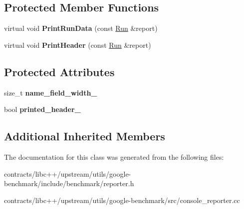 \subsection*{Protected Member Functions}
\begin{DoxyCompactItemize}
\item 
\mbox{\label{classbenchmark_1_1_console_reporter_a3759516cbd523319ffbd121514cfc7c0}} 
virtual void {\bfseries Print\+Run\+Data} (const \mbox{\hyperlink{structbenchmark_1_1_benchmark_reporter_1_1_run}{Run}} \&report)
\item 
\mbox{\label{classbenchmark_1_1_console_reporter_a9a039ddb97f3321309db8120c176f4d0}} 
virtual void {\bfseries Print\+Header} (const \mbox{\hyperlink{structbenchmark_1_1_benchmark_reporter_1_1_run}{Run}} \&report)
\end{DoxyCompactItemize}
\subsection*{Protected Attributes}
\begin{DoxyCompactItemize}
\item 
\mbox{\label{classbenchmark_1_1_console_reporter_a70035000337728074b93dfb9a95a7110}} 
size\+\_\+t {\bfseries name\+\_\+field\+\_\+width\+\_\+}
\item 
\mbox{\label{classbenchmark_1_1_console_reporter_a84683025b8ef739f751203e058c2544e}} 
bool {\bfseries printed\+\_\+header\+\_\+}
\end{DoxyCompactItemize}
\subsection*{Additional Inherited Members}


The documentation for this class was generated from the following files\+:\begin{DoxyCompactItemize}
\item 
contracts/libc++/upstream/utils/google-\/benchmark/include/benchmark/reporter.\+h\item 
contracts/libc++/upstream/utils/google-\/benchmark/src/console\+\_\+reporter.\+cc\end{DoxyCompactItemize}
